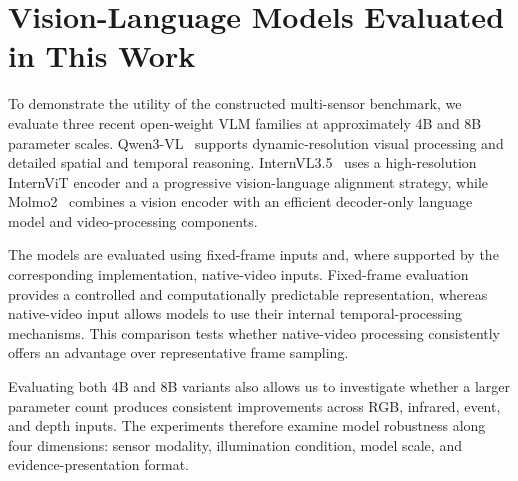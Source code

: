 \section{Vision-Language Models Evaluated in This Work}
\label{sec:rw_vlms}

To demonstrate the utility of the constructed multi-sensor benchmark, we
evaluate three recent open-weight VLM families at approximately 4B and 8B
parameter scales. Qwen3-VL~\cite{wang2024qwen2vl} supports dynamic-resolution
visual processing and detailed spatial and temporal reasoning.
InternVL3.5~\cite{chen2024internvl} uses a high-resolution InternViT encoder and
a progressive vision-language alignment strategy, while
Molmo2~\cite{deitke2024molmo} combines a vision encoder with an efficient
decoder-only language model and video-processing components.

The models are evaluated using fixed-frame inputs and, where supported by the
corresponding implementation, native-video inputs. Fixed-frame evaluation
provides a controlled and computationally predictable representation, whereas
native-video input allows models to use their internal temporal-processing
mechanisms. This comparison tests whether native-video processing consistently
offers an advantage over representative frame sampling.

Evaluating both 4B and 8B variants also allows us to investigate whether a
larger parameter count produces consistent improvements across RGB, infrared,
event, and depth inputs. The experiments therefore examine model robustness
along four dimensions: sensor modality, illumination condition, model scale,
and evidence-presentation format.